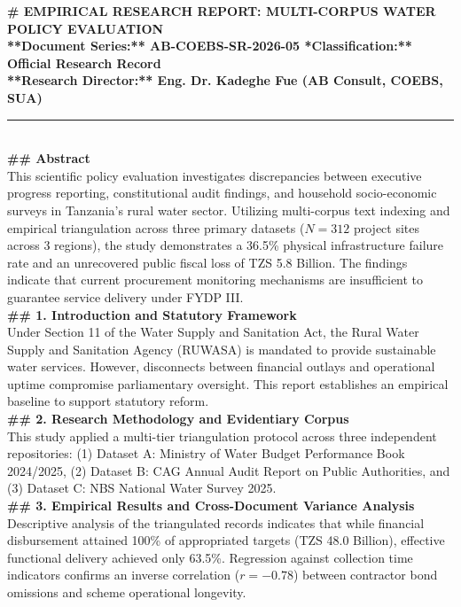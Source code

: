 \documentclass[11pt, a4paper]{report}
\begin{document}
\begin{tcolorbox}[colback=lightgrey, colframe=bordergrey, title=\textbf{Deliverable 5C Preview: \texttt{Report3\_Scientific\_Water\_Oversight.md}}]
\small
\textbf{\# EMPIRICAL RESEARCH REPORT: MULTI-CORPUS WATER POLICY EVALUATION}\\
\textbf{**Document Series:** AB-COEBS-SR-2026-05 \quad \textbar{} \quad **Classification:** Official Research Record}\\
\textbf{**Research Director:** Eng. Dr. Kadeghe Fue (AB Consult, COEBS, SUA)}\\[0.2cm]
\rule{\textwidth}{0.4pt}\\[0.2cm]
\textbf{\#\# Abstract}\\
This scientific policy evaluation investigates discrepancies between executive progress reporting, constitutional audit findings, and household socio-economic surveys in Tanzania's rural water sector. Utilizing multi-corpus text indexing and empirical triangulation across three primary datasets ($N=312$ project sites across 3 regions), the study demonstrates a 36.5\% physical infrastructure failure rate and an unrecovered public fiscal loss of TZS 5.8 Billion. The findings indicate that current procurement monitoring mechanisms are insufficient to guarantee service delivery under FYDP III.\\[0.2cm]
\textbf{\#\# 1. Introduction and Statutory Framework}\\
Under Section 11 of the Water Supply and Sanitation Act, the Rural Water Supply and Sanitation Agency (RUWASA) is mandated to provide sustainable water services. However, disconnects between financial outlays and operational uptime compromise parliamentary oversight. This report establishes an empirical baseline to support statutory reform.\\[0.2cm]
\textbf{\#\# 2. Research Methodology and Evidentiary Corpus}\\
This study applied a multi-tier triangulation protocol across three independent repositories: (1) Dataset A: Ministry of Water Budget Performance Book 2024/2025, (2) Dataset B: CAG Annual Audit Report on Public Authorities, and (3) Dataset C: NBS National Water Survey 2025.\\[0.2cm]
\textbf{\#\# 3. Empirical Results and Cross-Document Variance Analysis}\\
Descriptive analysis of the triangulated records indicates that while financial disbursement attained 100\% of appropriated targets (TZS 48.0 Billion), effective functional delivery achieved only 63.5\%. Regression against collection time indicators confirms an inverse correlation ($r = -0.78$) between contractor bond omissions and scheme operational longevity.\\[0.2cm]

\end{tcolorbox}
\end{document}
